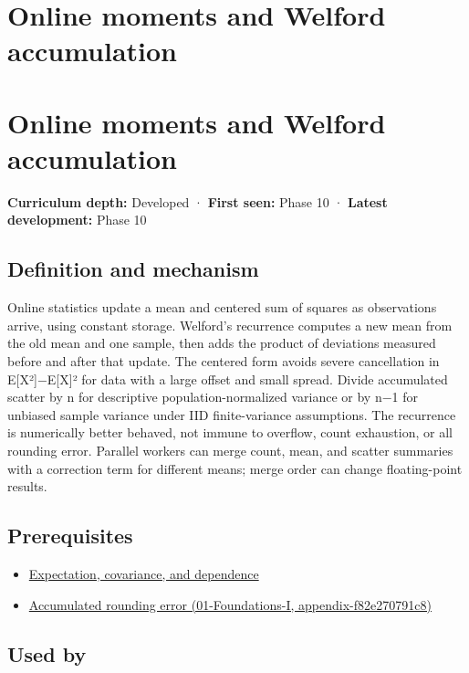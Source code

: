 \hypertarget{appendix-33237f0f618b}{}
\section*{Online moments and Welford accumulation}
\section{Online moments and Welford accumulation}\label{online-moments-and-welford-accumulation}

\textbf{Curriculum depth:} Developed · \textbf{First seen:} Phase 10 · \textbf{Latest development:} Phase 10

\subsection{Definition and mechanism}\label{definition-and-mechanism}

Online statistics update a mean and centered sum of squares as observations arrive, using constant storage. Welford's recurrence computes a new mean from the old mean and one sample, then adds the product of deviations measured before and after that update. The centered form avoids severe cancellation in E{[}X²{]}−E{[}X{]}² for data with a large offset and small spread. Divide accumulated scatter by n for descriptive population-normalized variance or by n−1 for unbiased sample variance under IID finite-variance assumptions. The recurrence is numerically better behaved, not immune to overflow, count exhaustion, or all rounding error. Parallel workers can merge count, mean, and scatter summaries with a correction term for different means; merge order can change floating-point results.

\subsection{Prerequisites}\label{prerequisites}

\begin{itemize}
\tightlist
\item
  \hyperref[appendix-54c383df9992]{Expectation, covariance, and dependence}
\item
  \href{}{Accumulated rounding error (01-Foundations-I, appendix-f82e270791c8)}
\end{itemize}

\subsection{Used by}\label{used-by}

